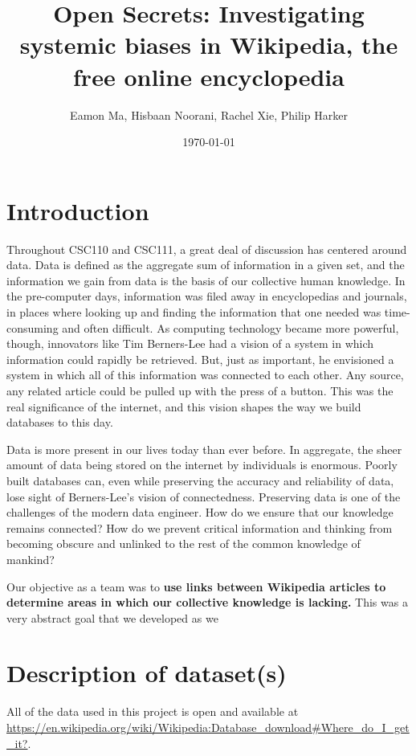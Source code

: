 \documentclass[fontsize=12pt]{article}
\title{Open Secrets: Investigating systemic biases in Wikipedia, the free online encyclopedia}
\author{Eamon Ma, Hisbaan Noorani, Rachel Xie, Philip Harker}
\date{\today}
\begin{document}
\maketitle
\begin{multicols}{2}
    \section{Introduction}
Throughout CSC110 and CSC111, a great deal of discussion has centered around data. Data is defined as the aggregate sum of information in a given set, and the information we gain from data is the basis of our collective human knowledge. In the pre-computer days, information was filed away in encyclopedias and journals, in places where looking up and finding the information that one needed was time-consuming and often difficult. As computing technology became more powerful, though, innovators like Tim Berners-Lee had a vision of a system in which information could rapidly be retrieved. But, just as important, he envisioned a system in which all of this information was connected to each other. Any source, any related article could be pulled up with the press of a button. This was the real significance of the internet, and this vision shapes the way we build databases to this day.

Data is more present in our lives today than ever before. In aggregate, the sheer amount of data being stored on the internet by individuals is enormous. Poorly built databases can, even while preserving the accuracy and reliability of data, lose sight of Berners-Lee's vision of connectedness. Preserving data is one of the challenges of the modern data engineer. How do we ensure that our knowledge remains connected? How do we prevent critical information and thinking from becoming obscure and unlinked to the rest of the common knowledge of mankind?

Our objective as a team was to \textbf{use links between Wikipedia articles to determine areas in which our collective knowledge is lacking.} This was a very abstract goal that we developed as we
    
    \section{Description of dataset(s)}
    All of the data used in this project is open and available at \href{https://en.wikipedia.org/wiki/Wikipedia:Database\_download\#Where\_do\_I\_get\_it?}{https://en.wikipedia.org/wiki/Wikipedia:Database\_download\#Where\_do\_I\_get\_it?}. \parencite{WikimediaDownloads}
    

\end{multicols}
\end{document}
